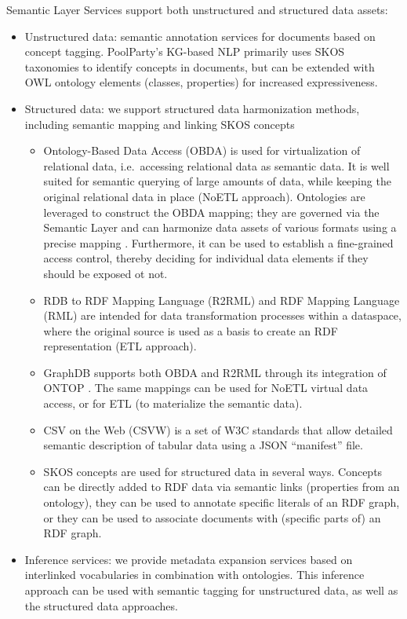 \documentclass[
  super,
  preprint,
  3p]{elsarticle}
\providecommand{\tightlist}{%
  \setlength{\itemsep}{0pt}\setlength{\parskip}{0pt}}\usepackage{longtable,booktabs,array}
\begin{document}
Semantic Layer Services support both unstructured and structured data
assets:

\begin{itemize}
\tightlist
\item
  Unstructured data: semantic annotation services for documents based on
  concept tagging. PoolParty's KG-based NLP primarily uses SKOS
  taxonomies to identify concepts in documents, but can be extended with
  OWL ontology elements (classes, properties) for increased
  expressiveness.
\item
  Structured data: we support structured data harmonization methods,
  including semantic mapping and linking SKOS concepts

  \begin{itemize}
  \tightlist
  \item
    Ontology-Based Data Access (OBDA) is used for virtualization of
    relational data, i.e.~accessing relational data as semantic data. It
    is well suited for semantic querying of large amounts of data, while
    keeping the original relational data in place (NoETL approach).
    Ontologies are leveraged to construct the OBDA mapping; they are
    governed via the Semantic Layer and can harmonize data assets of
    various formats using a precise mapping
    \citep{andreselAdaptingOntologybasedData2024}. Furthermore, it can
    be used to establish a fine-grained access control, thereby deciding
    for individual data elements if they should be exposed ot not.
  \item
    RDB to RDF Mapping Language (R2RML)
    \citep{souripriyadasR2RMLRDBRDF2012} and RDF Mapping Language (RML)
    \citep{RMLIntroduction2024} are intended for data transformation
    processes within a dataspace, where the original source is used as a
    basis to create an RDF representation (ETL approach).
  \item
    GraphDB supports both OBDA and R2RML through its integration of
    ONTOP \citep{bagosiOntopFrameworkOntology2014}. The same mappings
    can be used for NoETL virtual data access, or for ETL (to
    materialize the semantic data).
  \item
    CSV on the Web (CSVW) \citep{swirrlCSVWStandards2024} is a set of
    W3C standards that allow detailed semantic description of tabular
    data using a JSON ``manifest'' file.
  \item
    SKOS concepts are used for structured data in several ways. Concepts
    can be directly added to RDF data via semantic links (properties
    from an ontology), they can be used to annotate specific literals of
    an RDF graph, or they can be used to associate documents with
    (specific parts of) an RDF graph.
  \end{itemize}
\item
  Inference services: we provide metadata expansion services based on
  interlinked vocabularies in combination with ontologies. This
  inference approach can be used with semantic tagging for unstructured
  data, as well as the structured data approaches.


\end{itemize}
\end{document}
